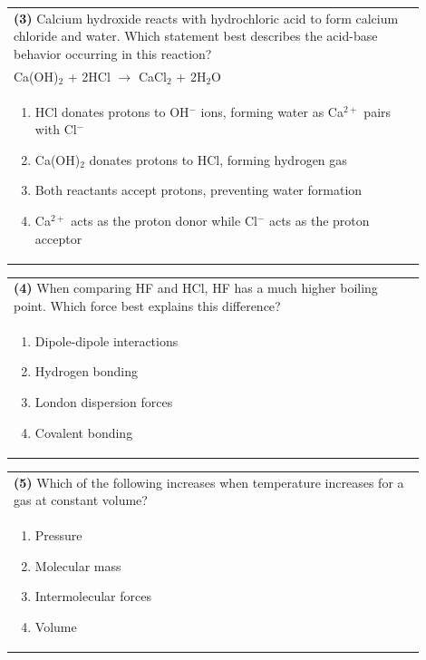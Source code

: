 \documentclass{article}
\begin{document}
\noindent\begin{tabular}{|p{0.9\linewidth}|}
\hline
\textbf{(3)} Calcium hydroxide reacts with hydrochloric acid to form calcium chloride and water. Which statement best describes the acid-base behavior occurring in this reaction?\\[0.2cm]
Ca(OH)$_2$ + 2HCl $\rightarrow$ CaCl$_2$ + 2H$_2$O\\[0.2cm]
\begin{minipage}[t]{0.85\linewidth}
\begin{enumerate}[label=\alph*.]
\item HCl donates protons to OH$^-$ ions, forming water as Ca$^{2+}$ pairs with Cl$^-$
\item Ca(OH)$_2$ donates protons to HCl, forming hydrogen gas
\item Both reactants accept protons, preventing water formation
\item Ca$^{2+}$ acts as the proton donor while Cl$^-$ acts as the proton acceptor
\end{enumerate}
\end{minipage}\\[0.2cm]
\hline
\end{tabular}

\noindent\begin{tabular}{|p{0.9\linewidth}|}
\hline
\textbf{(4)} When comparing HF and HCl, HF has a much higher boiling point. Which force best explains this difference?\\[0.2cm]
\begin{minipage}[t]{0.85\linewidth}
\begin{enumerate}[label=\alph*.]
\item Dipole-dipole interactions
\item Hydrogen bonding
\item London dispersion forces
\item Covalent bonding
\end{enumerate}
\end{minipage}\\[0.2cm]
\hline
\end{tabular}

\noindent\begin{tabular}{|p{0.9\linewidth}|}
\hline
\textbf{(5)} Which of the following increases when temperature increases for a gas at constant volume?\\[0.2cm]

\begin{minipage}[t]{0.85\linewidth}
\begin{enumerate}[label=\alph*.]
\item Pressure
\item Molecular mass
\item Intermolecular forces
\item Volume
\end{enumerate}
\end{minipage}\\[0.2cm]
\hline
\end{tabular}
\end{document}

